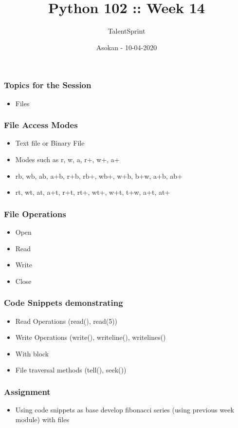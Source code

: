 \documentclass[14pt]{beamer}
\title{Python 102 :: Week 14}
\date{Asokan - 10-04-2020}
\author[TS]{TalentSprint}
\begin{document}
 
    \begin{frame}
        \titlepage
    \end{frame}
    \begin{frame}
        \frametitle{Topics for the Session}
        \begin{itemize}
            \item Files
        \end{itemize}
    \end{frame}

    \begin{frame}
        \frametitle{File Access Modes}
        \begin{itemize}
        	\item Text file or Binary File
        	\item Modes such as r, w, a, r+, w+, a+
        	\item rb, wb, ab, a+b, r+b, rb+, wb+, w+b, b+w, a+b, ab+
        	\item rt, wt, at, a+t, r+t, rt+, wt+, w+t, t+w, a+t, at+
        \end{itemize}
    \end{frame}

    \begin{frame}
        \frametitle{File Operations}
        \begin{itemize}
        	\item Open
        	\item Read
        	\item Write
        	\item Close
        \end{itemize}
    \end{frame}

    \begin{frame}
        \frametitle{Code Snippets demonstrating}
        \begin{itemize}
        	\item Read Operations (read(), read(5))
        	\item Write Operations (write(), writeline(), writelines()
        	\item With block
        	\item File traversal methods (tell(), seek())
        \end{itemize}
    \end{frame}

    \begin{frame}
        \frametitle{Assignment}
        \begin{itemize}
        	\item Using code snippets as base develop fibonacci series (using previous week module) with files
        \end{itemize}
    \end{frame}
\end{document}
